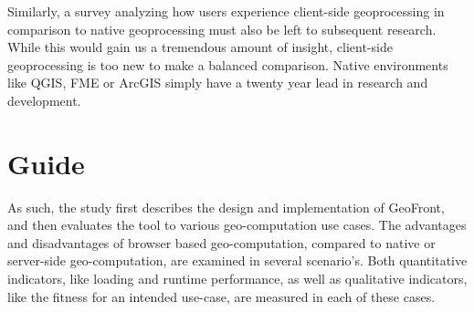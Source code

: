 
Similarly, a survey analyzing how users experience client-side geoprocessing in comparison to native geoprocessing must also be left to subsequent research. While this would gain us a tremendous amount of insight, client-side geoprocessing is too new to make a balanced comparison. Native environments like QGIS, FME or ArcGIS simply have a twenty year lead in research and development. 



\section{Guide}

As such, the study first describes the design and implementation of GeoFront, and then evaluates the tool to various geo-computation use cases.
The advantages and disadvantages of browser based geo-computation, compared to native or server-side geo-computation, are examined in several scenario's. 
Both quantitative indicators, like loading and runtime performance, as well as qualitative indicators, like the fitness for an intended use-case, are measured in each of these cases.
